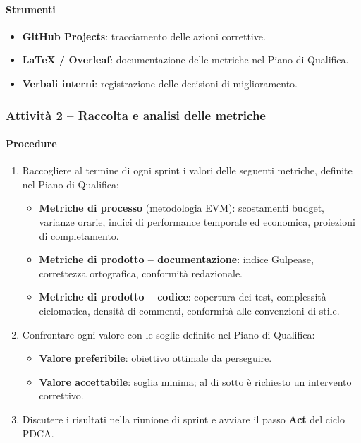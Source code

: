 \documentclass[a4paper, 11pt, oneside]{scrartcl}
\begin{document}
\paragraph{Strumenti}
\begin{itemize}
    \item \textbf{GitHub Projects}: tracciamento delle azioni correttive.
    \item \textbf{\LaTeX{} / Overleaf}: documentazione delle metriche nel Piano di Qualifica.
    \item \textbf{Verbali interni}: registrazione delle decisioni di miglioramento.
\end{itemize}

\subsubsection{Attività 2 – Raccolta e analisi delle metriche}

\paragraph{Procedure}
\begin{enumerate}
    \item Raccogliere al termine di ogni sprint i valori delle seguenti metriche, definite nel Piano di Qualifica{\scriptsize{}}:
          \begin{itemize}
              \item \textbf{Metriche di processo} (metodologia EVM{\scriptsize{}}): scostamenti budget, varianze orarie, indici di performance temporale ed economica, proiezioni di completamento.
              \item \textbf{Metriche di prodotto – documentazione}: indice Gulpease{\scriptsize{}}, correttezza ortografica, conformità redazionale.
              \item \textbf{Metriche di prodotto – codice}: copertura dei test, complessità ciclomatica, densità di commenti, conformità alle convenzioni di stile.
          \end{itemize}
    \item Confrontare ogni valore con le soglie definite nel Piano di Qualifica:
          \begin{itemize}
              \item \textbf{Valore preferibile}: obiettivo ottimale da perseguire.
              \item \textbf{Valore accettabile}: soglia minima; al di sotto è richiesto un intervento correttivo.
          \end{itemize}
    \item Discutere i risultati nella riunione di sprint e avviare il passo \textbf{Act} del ciclo PDCA.
\end{enumerate}
\end{document}
